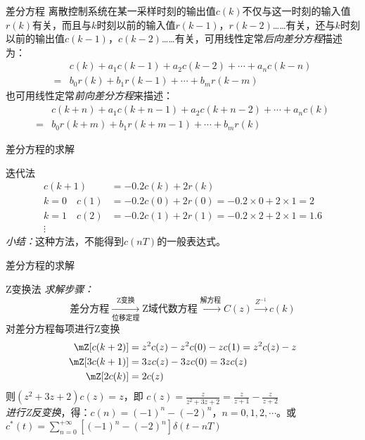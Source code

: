\documentclass[handout,cjkutf8,table,aspectratio=1610]{beamer} %
\begin{document}
\begin{frame}{差分方程}
	离散控制系统在某一采样时刻的输出值$c(k)$不仅与这一时刻的输入值$r(k)$有关，而且\alert{与$k$时刻以前}的输入值$r(k-1)$，$r(k-2)$……有关，还与$k$时刻以前的输出值$c(k-1)$，$c(k-2)$……有关，可用\alert{线性定常}\emph{后向差分方程}描述为：
	\begin{align*}
		&c(k)+a_1c(k-1)+a_2c(k-2)+\cdots+a_nc(k-n)\\
		=&b_0r(k)+b_1r(k-1)+\cdots+b_mr(k-m)
	\end{align*}
	也可用\alert{线性定常}\emph{前向差分方程}来描述：
	\begin{align*}
		&c(k+n)+a_1c(k+n-1)+a_2c(k+n-2)+\cdots+a_nc(k)\\
		=&b_0r(k+m)+b_1r(k+m-1)+\cdots+b_mr(k)
	\end{align*}
\end{frame}

\begin{frame}{差分方程的求解}
	\begin{block}{迭代法}
		\solution
		\begin{align*}
			c(k+1) 		&= -0.2c(k)+2r(k)\\
			k=0\quad c(1)	&= -0.2c(0)+2r(0)=-0.2\times 0+2\times 1=2\\
			k=1\quad c(2)	&= -0.2c(1)+2r(1)=-0.2\times 2+2\times 1=1.6\\
			\vdots&
		\end{align*}
		\emph{小结：}这种方法，\alert{不能得到}$c(nT)$的一般表达式。
	\end{block}
\end{frame}

\begin{frame}{差分方程的求解}
	\vs{-1em}
	\begin{block}{Z变换法}
		\emph{求解步骤：}
		$$\text{差分方程}\xrightarrow[\text{位移定理}]{\text{Z变换}}\text{Z域代数方程}\xrightarrow{\text{解方程}}C(z)\xrightarrow{Z^{-1}}c(k)$$
		\solution 对差分方程每项进行Z变换
		\begin{align*}
			\mZ[c(k+2)]	&= z^2c(z)-z^2c(0)-zc(1)=z^2c(z)-z\\
			\mZ[3c(k+1)]	&= 3zc(z)-3zc(0)=3zc(z)\\
			\mZ[2c(k)]	&= 2c(z)
		\end{align*}
		则$(z^2+3z+2)c(z)=z$，即
		$c(z)=\frac{z}{z^2+3z+2}=\frac{z}{z+1}-\frac{z}{z+2}$\\
		\emph{进行Z反变换}，得：$c(n)=(-1)^n-(-2)^n$，$n=0,1,2,\cdots$。或$c^*(t)=\sum_{n=0}^{+\infty}[(-1)^n-(-2)^n]\delta(t-nT)$
	\end{block}
\end{frame}
\end{document}
